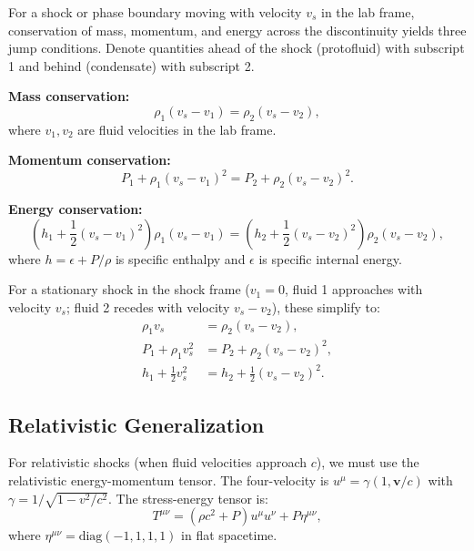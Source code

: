 \documentclass[11pt,a4paper]{article}
\theoremstyle{definition}
\theoremstyle{remark}
\begin{document}
For a shock or phase boundary moving with velocity $v_s$ in the lab frame, conservation of mass, momentum, and energy across the discontinuity yields three jump conditions. Denote quantities ahead of the shock (protofluid) with subscript 1 and behind (condensate) with subscript 2.

\textbf{Mass conservation:}
\begin{equation}
\label{eq:rh_mass}
\rho_1(v_s - v_1) = \rho_2(v_s - v_2),
\end{equation}
where $v_1, v_2$ are fluid velocities in the lab frame.

\textbf{Momentum conservation:}
\begin{equation}
\label{eq:rh_momentum}
P_1 + \rho_1(v_s - v_1)^2 = P_2 + \rho_2(v_s - v_2)^2.
\end{equation}

\textbf{Energy conservation:}
\begin{equation}
\label{eq:rh_energy}
\left(h_1 + \frac{1}{2}(v_s - v_1)^2\right)\rho_1(v_s - v_1) = \left(h_2 + \frac{1}{2}(v_s - v_2)^2\right)\rho_2(v_s - v_2),
\end{equation}
where $h = \epsilon + P/\rho$ is specific enthalpy and $\epsilon$ is specific internal energy.

For a stationary shock in the shock frame ($v_1 = 0$, fluid 1 approaches with velocity $v_s$; fluid 2 recedes with velocity $v_s - v_2$), these simplify to:
\begin{align}
\rho_1 v_s &= \rho_2(v_s - v_2), \label{eq:rh_mass_shock} \\
P_1 + \rho_1 v_s^2 &= P_2 + \rho_2(v_s - v_2)^2, \label{eq:rh_momentum_shock} \\
h_1 + \frac{1}{2}v_s^2 &= h_2 + \frac{1}{2}(v_s - v_2)^2. \label{eq:rh_energy_shock}
\end{align}

\subsection{Relativistic Generalization}
\label{sec:rh_relativistic}

For relativistic shocks (when fluid velocities approach $c$), we must use the relativistic energy-momentum tensor. The four-velocity is $u^\mu = \gamma(1, \mathbf{v}/c)$ with $\gamma = 1/\sqrt{1 - v^2/c^2}$. The stress-energy tensor is:
\begin{equation}
T^{\mu\nu} = (\rho c^2 + P)u^\mu u^\nu + P \eta^{\mu\nu},
\end{equation}
where $\eta^{\mu\nu} = \text{diag}(-1,1,1,1)$ in flat spacetime.
\end{document}
